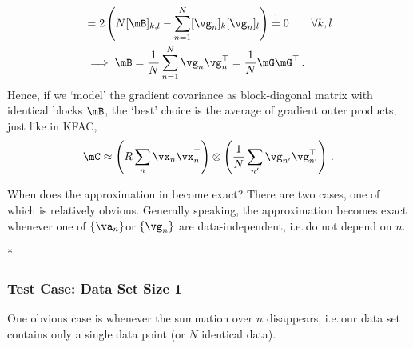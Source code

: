 \begin{example}
\begin{align*}
    &=
      2 \left( N[\mB]_{k,l} - \sum_{n=1}^N [\vg_n]_k [\vg_n]_l \right)
      \stackrel{!}{=} 0 \qquad\forall k,l
    \\
    &\implies
      \mB = \frac{1}{N} \sum_{n=1}^N \vg_n \vg_n^{\top}
      = \frac{1}{N} \mG \mG^{\top}\,.
  \end{align*}
  Hence, if we `model' the gradient covariance as block-diagonal matrix with identical blocks $\mB$, the `best' choice is the average of gradient outer products, just like in KFAC,
  \begin{align*}
    \mC
    \approx
    \left(R \sum_n \vx_n \vx_n^\top \right)
    \otimes
    \left(\frac{1}{N} \sum_{n'} \vg_{n'} \vg_{n'}^\top \right)\,.
  \end{align*}
\end{example}

When does the approximation in  become exact?
There are two cases, one of which is relatively obvious.
Generally speaking, the approximation becomes exact whenever one of $\{\va_n\}$or $\{\vg_n\}$ are data-independent, i.e.\,do not depend on $n$.


\switchcolumn[1]*
\switchcolumn[0]

\subsubsection{Test Case: Data Set Size 1}
One obvious case is whenever the summation over $n$ disappears, i.e.\,our data set contains only a single data point (or $N$ identical data).

